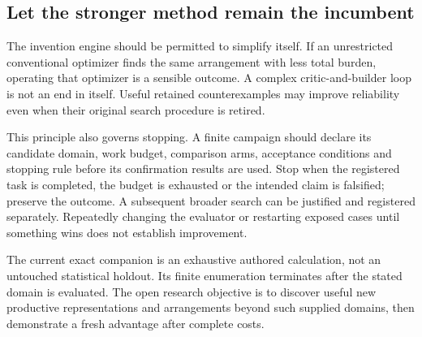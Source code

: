 \subsection{Let the stronger method remain the incumbent}
The invention engine should be permitted to simplify itself. If an unrestricted conventional optimizer finds the same arrangement with less total burden, operating that optimizer is a sensible outcome. A complex critic-and-builder loop is not an end in itself. Useful retained counterexamples may improve reliability even when their original search procedure is retired.

This principle also governs stopping. A finite campaign should declare its candidate domain, work budget, comparison arms, acceptance conditions and stopping rule before its confirmation results are used. Stop when the registered task is completed, the budget is exhausted or the intended claim is falsified; preserve the outcome. A subsequent broader search can be justified and registered separately. Repeatedly changing the evaluator or restarting exposed cases until something wins does not establish improvement.

The current exact companion is an exhaustive authored calculation, not an untouched statistical holdout. Its finite enumeration terminates after the stated domain is evaluated. The open research objective is to discover useful new productive representations and arrangements beyond such supplied domains, then demonstrate a fresh advantage after complete costs.
